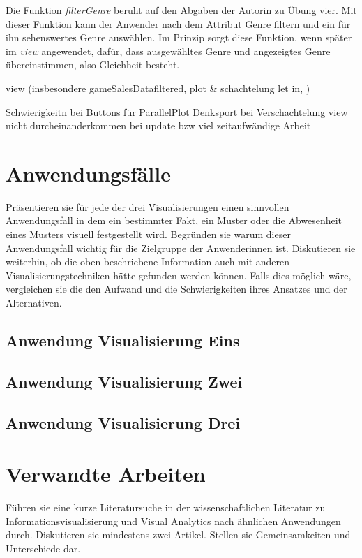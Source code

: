 \documentclass[usegeometry=true]{scrartcl}
\begin{document}
Die Funktion \textit{filterGenre} beruht auf den Abgaben der Autorin zu Übung vier. Mit dieser Funktion kann der Anwender nach dem Attribut Genre filtern und ein für ihn sehenswertes Genre auswählen.
Im Prinzip sorgt diese Funktion, wenn später im \textit{view} angewendet, dafür, dass ausgewähltes Genre und angezeigtes Genre übereinstimmen, also Gleichheit besteht.

view (insbesondere gameSalesDatafiltered, plot & schachtelung let in, )

Schwierigkeitn bei Buttons für ParallelPlot
Denksport bei Verschachtelung view
nicht durcheinanderkommen bei update bzw viel zeitaufwändige Arbeit


\section{Anwendungsfälle}
Präsentieren sie für jede der drei Visualisierungen einen sinnvollen Anwendungsfall in dem ein bestimmter Fakt, ein Muster oder die Abwesenheit eines Musters visuell festgestellt wird. Begründen sie warum dieser Anwendungsfall wichtig für die Zielgruppe der Anwenderinnen ist. Diskutieren sie weiterhin, ob die oben beschriebene Information auch mit anderen Visualisierungstechniken hätte gefunden werden können. Falls dies möglich wäre, vergleichen sie die den Aufwand und die Schwierigkeiten ihres Ansatzes und der Alternativen. 
\subsection{Anwendung Visualisierung Eins}
\subsection{Anwendung Visualisierung Zwei}
\subsection{Anwendung Visualisierung Drei}

\section{Verwandte Arbeiten}
Führen sie eine kurze Literatursuche in der wissenschaftlichen Literatur zu Informationsvisualisierung und Visual Analytics nach ähnlichen Anwendungen durch. Diskutieren sie mindestens zwei Artikel. Stellen sie Gemeinsamkeiten und Unterschiede dar.
\end{document}

